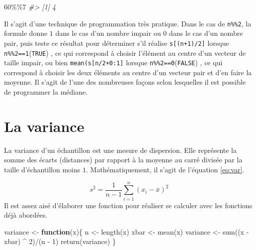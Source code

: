 \documentclass[
]{book}
\newenvironment{Shaded}{}{}
\newcommand{\CommentTok}[1]{\textit{#1}}
\newcommand{\ControlFlowTok}[1]{\textbf{#1}}
\newcommand{\DecValTok}[1]{#1}
\newcommand{\FunctionTok}[1]{#1}
\newcommand{\NormalTok}[1]{#1}
\newcommand{\OtherTok}[1]{#1}
\newcommand{\SpecialCharTok}[1]{#1}
\begin{document}
\begin{Shaded}
\begin{Highlighting}[]
\DecValTok{60}\SpecialCharTok{\%\%}\DecValTok{7}
\CommentTok{\#\textgreater{} [1] 4}
\end{Highlighting}
\end{Shaded}

Il s'agit d'une technique de programmation très pratique. Dans le cas de \texttt{n\%\%2}, la formule donne \(1\) dans le cas d'un nombre impair ou \(0\) dans le cas d'un nombre pair, puis teste ce résultat pour déterminer s'il réalise \texttt{s{[}(n+1)/2{]}} lorsque \texttt{n\%\%2==1}(\texttt{TRUE}) , ce qui correspond à choisir l'élément au centre d'un vecteur de taille impair, ou bien \texttt{mean(s{[}n/2+0:1{]}} lorsque \texttt{n\%\%2==0}(\texttt{FALSE}) , ce qui correspond à choisir les deux éléments au centre d'un vecteur pair et d'en faire la moyenne. Il s'agit de l'une des nombreuses façons selon lesquelles il est possible de programmer la médiane.

\hypertarget{la-variance}{%
\section{La variance}\label{la-variance}}

La variance d'un échantillon est une mesure de dispersion. Elle représente la somme des écarts (distances) par rapport à la moyenne au carré divisée par la taille d'échantillon moins \(1\). Mathématiquement, il s'agit de l'équation \eqref{eq:var}.

\[
s^2 = \frac{1}{n-1}\sum_{i=1}^n(x_i-\bar{x})^2
\label{eq:var}
\]
Il est assez aisé d'élaborer une fonction pour réaliser se calculer avec les fonctions déjà abordées.

\begin{Shaded}
\begin{Highlighting}[]
\NormalTok{variance }\OtherTok{\textless{}{-}} \ControlFlowTok{function}\NormalTok{(x)\{}
\NormalTok{  n }\OtherTok{\textless{}{-}} \FunctionTok{length}\NormalTok{(x)}
\NormalTok{  xbar }\OtherTok{\textless{}{-}} \FunctionTok{mean}\NormalTok{(x)}
\NormalTok{  variance }\OtherTok{\textless{}{-}} \FunctionTok{sum}\NormalTok{((x }\SpecialCharTok{{-}}\NormalTok{ xbar) }\SpecialCharTok{\^{}} \DecValTok{2}\NormalTok{)}\SpecialCharTok{/}\NormalTok{(n }\SpecialCharTok{{-}} \DecValTok{1}\NormalTok{)}
  \FunctionTok{return}\NormalTok{(variance)}
\NormalTok{\}}
\end{Highlighting}
\end{Shaded}
\end{document}
